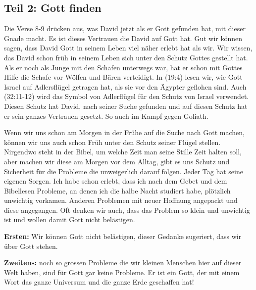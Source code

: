 \documentclass[14pt]{../../inc/mybib}
\begin{document}
    \subsection*{Teil 2: Gott finden}
    \begin{block}
        Die Verse 8-9 drücken aus, was David jetzt als er Gott gefunden hat, mit dieser Gnade macht. Es ist dieses Vertrauen die David auf Gott hat. Gut wir können sagen, dass David Gott in seinem Leben viel näher erlebt hat als wir. Wir wissen, das David schon früh in seinem Leben sich unter den Schutz Gottes gestellt hat. Als er noch als Junge mit den Schafen unterwegs war, hat er schon mit Gottes Hilfe die Schafe vor Wölfen und Bären verteidigt. In (19:4) lesen wir, wie Gott Israel auf Adlersflügel getragen hat, als sie vor den Ägypter geflohen sind. Auch (32:11-12) wird das Symbol von Adlerflügel für den Schutz von Israel verwendet. Diesen Schutz hat David, nach seiner Suche gefunden und auf diesen Schutz hat er sein ganzes Vertrauen gesetzt. So auch im Kampf gegen Goliath. 
    \end{block}
    \begin{block}
        Wenn wir uns schon am Morgen in der Frühe auf die Suche nach Gott machen, können wir uns auch schon Früh unter den Schutz seiner Flügel stellen. Nirgendwo steht in der Bibel, um welche Zeit man seine Stille Zeit halten soll, aber machen wir diese am Morgen vor dem Alltag, gibt es uns Schutz und Sicherheit für die Probleme die unweigerlich darauf folgen. Jeder Tag hat seine eigenen Sorgen. 
        Ich habe schon erlebt, dass ich nach dem Gebet und dem Bibellesen Probleme, an denen ich die halbe Nacht studiert habe, plötzlich unwichtig vorkamen. Anderen Problemen mit neuer Hoffnung angepackt und diese angegangen. Oft denken wir auch, dass das Problem so klein und unwichtig ist und wollen damit Gott nicht belästigen. 
        
        
        \textbf{Ersten:} Wir können Gott nicht belästigen, dieser Gedanke sugeriert, dass wir über Gott stehen. 
        
        \textbf{Zweitens:}  noch so grossen Probleme die wir kleinen Menschen hier auf dieser Welt haben, sind für Gott gar keine Probleme. Er ist ein Gott, der mit einem Wort das ganze Universum und die ganze Erde geschaffen hat!
    \end{block}
\end{document}
